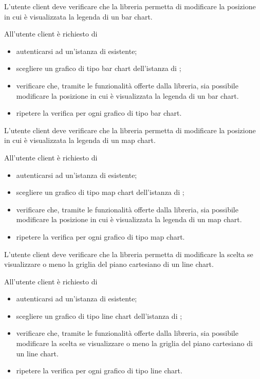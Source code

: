 	L'utente client deve verificare che la libreria permetta di modificare la posizione in cui è visualizzata la legenda di un bar chart.
		
		All'utente client è richiesto di
		\begin{itemize}
			\item autenticarsi ad un'istanza di \projectname{} esistente;
			\item scegliere un grafico di tipo bar chart dell'istanza di \projectname{};
			\item verificare che, tramite le funzionalità offerte dalla libreria, sia possibile modificare la posizione in cui è visualizzata la legenda di un bar chart.
			\item ripetere la verifica per ogni grafico di tipo bar chart.
		\end{itemize}

	L'utente client deve verificare che la libreria permetta di modificare la posizione in cui è visualizzata la legenda di un map chart.
		
		All'utente client è richiesto di
		\begin{itemize}
			\item autenticarsi ad un'istanza di \projectname{} esistente;
			\item scegliere un grafico di tipo map chart dell'istanza di \projectname{};
			\item verificare che, tramite le funzionalità offerte dalla libreria, sia possibile modificare la posizione in cui è visualizzata la legenda di un map chart.
			\item ripetere la verifica per ogni grafico di tipo map chart.
		\end{itemize}

	L'utente client deve verificare che la libreria permetta di modificare la scelta se visualizzare o meno la griglia del piano cartesiano di un line chart.
		
		All'utente client è richiesto di
		\begin{itemize}
			\item autenticarsi ad un'istanza di \projectname{} esistente;
			\item scegliere un grafico di tipo line chart dell'istanza di \projectname{};
			\item verificare che, tramite le funzionalità offerte dalla libreria, sia possibile modificare la scelta se visualizzare o meno la griglia del piano cartesiano di un line chart.
			\item ripetere la verifica per ogni grafico di tipo line chart.
		\end{itemize}

